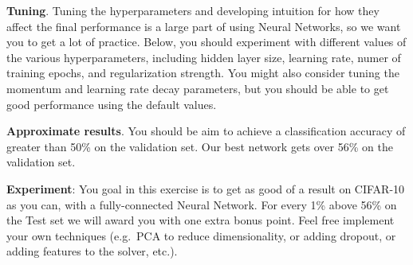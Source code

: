 \documentclass[11pt]{article}
\begin{document}
\textbf{Tuning}. Tuning the hyperparameters and developing intuition for
how they affect the final performance is a large part of using Neural
Networks, so we want you to get a lot of practice. Below, you should
experiment with different values of the various hyperparameters,
including hidden layer size, learning rate, numer of training epochs,
and regularization strength. You might also consider tuning the momentum
and learning rate decay parameters, but you should be able to get good
performance using the default values.

\textbf{Approximate results}. You should be aim to achieve a
classification accuracy of greater than 50\% on the validation set. Our
best network gets over 56\% on the validation set.

\textbf{Experiment}: You goal in this exercise is to get as good of a
result on CIFAR-10 as you can, with a fully-connected Neural Network.
For every 1\% above 56\% on the Test set we will award you with one
extra bonus point. Feel free implement your own techniques (e.g.~PCA to
reduce dimensionality, or adding dropout, or adding features to the
solver, etc.).
\end{document}
